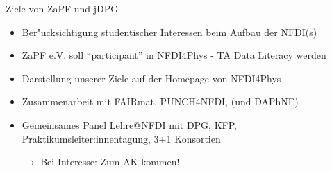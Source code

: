 \documentclass[compress, aspectratio=169]{beamer}
\begin{document}
\begin{frame}{\insertsubsection}
	Ziele von ZaPF und jDPG
	\begin{itemize}
		\item Ber"ucksichtigung studentischer Interessen beim Aufbau der NFDI(s)
		\item ZaPF e.V. soll ``participant'' in NFDI4Phys - TA Data Literacy werden
		\item Darstellung unserer Ziele auf der Homepage von NFDI4Phys
		\item Zusammenarbeit mit FAIRmat, PUNCH4NFDI, (und DAPhNE) 
		\item Gemeinsames Panel Lehre@NFDI mit DPG, KFP, Praktikumsleiter:innentagung, 3+1 Konsortien
		\vspace{4mm}\item[$\rightarrow$] Bei Interesse: Zum AK kommen!
	\end{itemize}
\end{frame}
\end{document}
